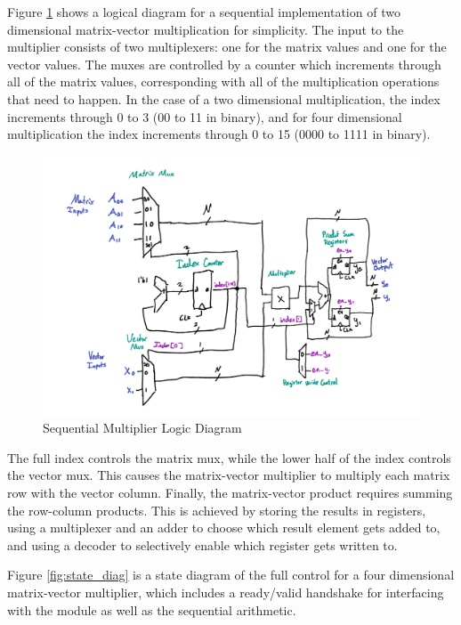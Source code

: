 \documentclass{article}
\begin{document}
Figure \ref{fig:seq_mult} shows a logical diagram for a sequential implementation of two dimensional matrix-vector multiplication for simplicity. The input to the multiplier consists of two multiplexers: one for the matrix values and one for the vector values. The muxes are controlled by a counter which increments through all of the matrix values, corresponding with all of the multiplication operations that need to happen. In the case of a two dimensional multiplication, the index increments through 0 to 3 (00 to 11 in binary), and for four dimensional multiplication the index increments through 0 to 15 (0000 to 1111 in binary).
\begin{figure}
    \centering  %
    \includegraphics[width = .8\textwidth]{Sequential_Multiplier.png}
    \caption{Sequential Multiplier Logic Diagram}
    \label{fig:seq_mult}
\end{figure}
The full index controls the matrix mux, while the lower half of the index controls the vector mux. This causes the matrix-vector multiplier to multiply each matrix row with the vector column. Finally, the matrix-vector product requires summing the row-column products. This is achieved by storing the results in registers, using a multiplexer and an adder to choose which result element gets added to, and using a decoder to selectively enable which register gets written to.

Figure \ref{fig:state_diag} is a state diagram of the full control for a four dimensional matrix-vector multiplier, which includes a ready/valid handshake for interfacing with the module as well as the sequential arithmetic.
\end{document}
